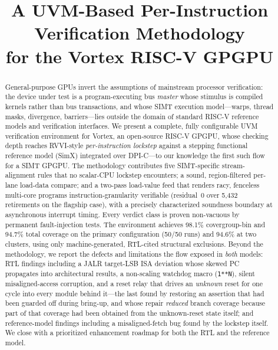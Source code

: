 \documentclass[conference]{IEEEtran}
\newcommand{\code}[1]{\texttt{\small #1}}
\begin{document}
\title{A UVM-Based Per-Instruction Verification Methodology\\
for the Vortex RISC-V GPGPU}

\author{
}

\maketitle

\begin{abstract}
General-purpose GPUs invert the assumptions of mainstream processor
verification: the device under test is a program-executing bus
\emph{master} whose stimulus is compiled kernels rather than bus
transactions, and whose SIMT execution model---warps, thread masks,
divergence, barriers---lies outside the domain of standard RISC-V
reference models and verification interfaces. We present a complete,
fully configurable UVM verification environment for Vortex, an
open-source RISC-V GPGPU, whose checking depth reaches RVVI-style
\emph{per-instruction lockstep} against a stepping functional reference
model (SimX) integrated over DPI-C---to our knowledge the first such
flow for a SIMT GPGPU. The methodology contributes five SIMT-specific
stream-alignment rules that no scalar-CPU lockstep encounters; a sound,
region-filtered per-lane load-data compare; and a two-pass load-value
feed that renders racy, fenceless multi-core programs
instruction-granularity verifiable (residual~0 over 5{,}432 retirements
on the flagship case), with a precisely characterized soundness boundary
at asynchronous interrupt timing. Every verdict class is proven
non-vacuous by permanent fault-injection tests. The environment achieves
98.1\% covergroup-bin and 94.7\% total coverage on the primary
configuration (50/50 runs) and 94.6\% at two clusters, using only machine-generated,
RTL-cited structural exclusions. Beyond the methodology, we report the
defects and limitations the flow exposed in \emph{both} models: RTL
findings including a JALR target-LSB ISA deviation whose skewed PC
propagates into architectural results, a non-scaling watchdog macro
(\code{1**N}), silent misaligned-access corruption, and a reset relay
that drives an \emph{unknown} reset for one cycle into every module
behind it---the last found by restoring an assertion that had been
guarded off during bring-up, and whose repair \emph{reduced} branch
coverage because part of that coverage had been obtained from the
unknown-reset state itself; and
reference-model findings including a misaligned-fetch bug found by the
lockstep itself. We close with a prioritized enhancement roadmap for
both the RTL and the reference model.
\end{abstract}
\end{document}
